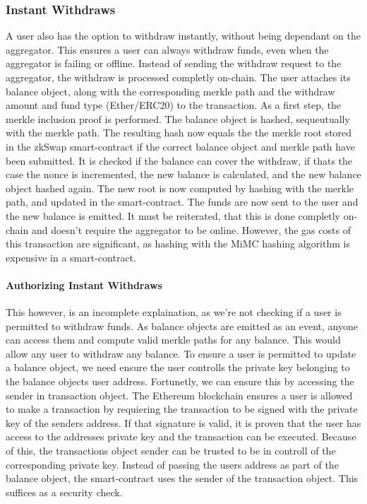 \documentclass[../../thesis.tex]{subfiles}
\begin{document}
\subsubsection{Instant Withdraws}
A user also has the option to withdraw instantly, without being dependant on the aggregator. This ensures a user can always withdraw funds, even when the aggregator is failing or offline. Instead of sending the withdraw request to the aggregator, the withdraw is processed completly on-chain. The user attaches its balance object, along with the corresponding merkle path and the withdraw amount and fund type (Ether/ERC20) to the transaction. As a first step, the merkle inclusion proof is performed. The balance object is hashed, sequeutually with the merkle path. The resulting hash now equals the the merkle root stored in the zkSwap smart-contract if the correct balance object and merkle path have been submitted. It is checked if the balance can cover the withdraw, if thats the case the nonce is incremented, the new balance is calculated, and the new balance object hashed again. The new root is now computed by hashing with the merkle path, and updated in the smart-contract. The funds are now sent to the user and the new balance is emitted. It must be reiterated, that this is done completly on-chain and doesn't require the aggregator to be online. However, the gas costs of this transaction are significant, as hashing with the MiMC hashing algorithm is expensive in a smart-contract.

\paragraph{Authorizing Instant Withdraws}
This however, is an incomplete explaination, as we're not checking if a user is permitted to withdraw funds. As balance objects are emitted as an event, anyone can access them and compute valid merkle paths for any balance. This would allow any user to withdraw any balance. To ensure a user is permitted to update a balance object, we need ensure the user controlls the private key belonging to the balance objects user address. Fortunetly, we can ensure this by accessing the sender in transaction object. The Ethereum blockchain ensures a user is allowed to make a transaction by requiering the transaction to be signed with the private key of the senders address. If that signature is valid, it is proven that the user has access to the addresses private key and the transaction can be executed. Because of this, the transactions object sender can be trusted to be in controll of the corresponding private key. Instead of passing the users address as part of the balance object, the smart-contract uses the sender of the transaction object. This suffices as a security check.
\end{document}
